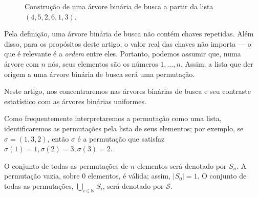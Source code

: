 \begin{figure}[h]
    \centering
    \caption{
        Construção de uma árvore binária de busca a partir da lista $(4, 5, 2, 6, 1, 3)$.
    }
    \label{fig:bst-construction}
\end{figure}

Pela definição,
uma árvore binária de busca não contém chaves repetidas.
Além disso,
para os propósitos deste artigo,
o valor real das chaves não importa
--- o que é relevante é a \emph{ordem} entre eles.
Portanto,
podemos assumir que,
numa árvore com $n$ nós,
seus elementos são os números $1, \dots, n$.
Assim,
a lista que der origem a uma árvore binária de busca
será uma permutação.

Neste artigo,
nos concentraremos nas árvores binárias de busca
e seu contraste estatístico com as árvores binárias uniformes.

\begin{notation}
    Como frequentemente interpretaremos a permutação como uma lista,
    identificaremos as permutações pela lista de seus elementos;
    por exemplo, se $\sigma = (1, 3, 2)$,
    então $\sigma$ é a permutação que satisfaz
    $\sigma(1) = 1, \sigma(2) = 3, \sigma(3) = 2$.

    O conjunto de todas as permutações de $n$ elementos será denotado por $S_n$.
    A permutação vazia, sobre $0$ elementos, é válida;
    assim, $|S_0| = 1$.
    O conjunto de todas as permutações, $\bigcup_{i \in \mathbb N} S_i$,
    será denotado por $\mathcal S$.
\end{notation}
